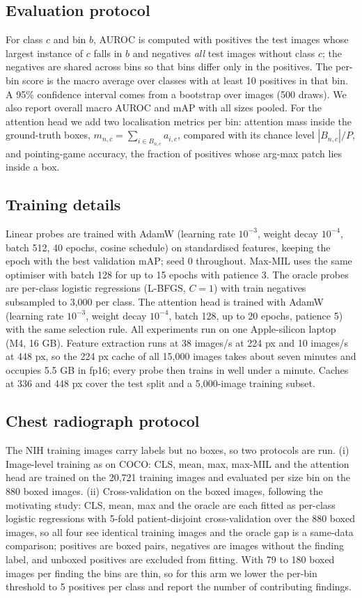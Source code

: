 \documentclass[10pt,letterpaper,twocolumn]{article}
\begin{document}
\subsection{Evaluation protocol}
For class $c$ and bin $b$, AUROC is computed with positives the test images whose largest
instance of $c$ falls in $b$ and negatives \emph{all} test images without class $c$; the
negatives are shared across bins so that bins differ only in the positives. The per-bin score
is the macro average over classes with at least 10 positives in that bin. A 95\% confidence
interval comes from a bootstrap over images (500 draws). We also report overall macro AUROC
and mAP with all sizes pooled. For the attention head we add two localisation metrics per bin:
attention mass inside the ground-truth boxes, $m_{n,c}=\sum_{i\in B_{n,c}} a_{i,c}$, compared
with its chance level $|B_{n,c}|/P$, and pointing-game accuracy, the fraction of positives
whose arg-max patch lies inside a box.

\subsection{Training details}
Linear probes are trained with AdamW (learning rate $10^{-3}$, weight decay $10^{-4}$, batch
512, 40 epochs, cosine schedule) on standardised features, keeping the epoch with the best
validation mAP; seed 0 throughout. Max-MIL uses the same optimiser with batch 128 for up to 15
epochs with patience 3. The oracle probes are per-class logistic regressions (L-BFGS, $C=1$)
with train negatives subsampled to 3,000 per class. The attention head is trained with AdamW
(learning rate $10^{-3}$, weight decay $10^{-4}$, batch 128, up to 20 epochs, patience 5) with
the same selection rule. All experiments run on one Apple-silicon laptop (M4, 16 GB). Feature
extraction runs at 38 images/s at 224 px and 10 images/s at 448 px, so the 224 px cache of all
15,000 images takes about seven minutes and occupies 5.5 GB in fp16; every probe then trains
in well under a minute. Caches at 336 and 448 px cover the test split and a 5,000-image
training subset.

\subsection{Chest radiograph protocol}
\label{sec:cxr-protocol}
The NIH training images carry labels but no boxes, so two protocols are run. (i) Image-level
training as on COCO: CLS, mean, max, max-MIL and the attention head are trained on the 20,721
training images and evaluated per size bin on the 880 boxed images. (ii) Cross-validation on
the boxed images, following the motivating study: CLS, mean, max and the oracle are each
fitted as per-class logistic regressions with 5-fold patient-disjoint cross-validation over
the 880 boxed images, so all four see identical training images and the oracle gap is a
same-data comparison; positives are boxed pairs, negatives are images without the finding
label, and unboxed positives are excluded from fitting. With 79 to 180 boxed images per
finding the bins are thin, so for this arm we lower the per-bin threshold to 5 positives per
class and report the number of contributing findings.
\end{document}
